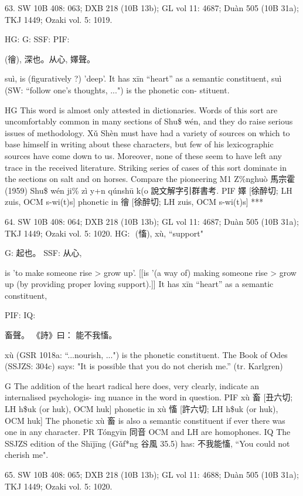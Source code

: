 63. SW 10B 408: 063; DXB 218 (10B 13b); GL vol 11: 4687; Duàn 505 (10B 31a); TKJ 1449; Ozaki vol. 5: 1019.


HG:
G: SSF: PIF:

(徻),
深也。从心, 嬕聲。

suì,
is (figuratively ?) 'deep'.
It has xīn ``heart'' as a semantic constituent,
suì (SW: ``follow one's thoughts, ...") is the phonetic con- stituent.

HG This word is almost only attested in dictionaries. Words of this sort are uncomfortably common in many sections of Shu\$ wén, and they do raise serious issues of methodology. Xǔ Shèn must have had a variety of sources on which to base himself in writing about these characters, but few of his lexicographic sources have come down to us. Moreover, none of these seem to have left any trace in the received literature. Striking series of cases of this sort dominate in the sections on salt  and  on  horses.  Compare  the  pioneering  M1  Z\%nghuò  馬宗霍 (1959)  Shu\$  wén  ji\%  zì  y+n qúnshū k(o 說文解字引群書考.
PIF     嬕 [徐醉切; LH zuis, OCM s-wi(t)s] phonetic in 徻 [徐醉切; LH zuis, OCM s-wi(t)s]
***

64. SW 10B 408: 064; DXB 218 (10B 13b); GL vol 11: 4687; Duàn 505 (10B 31a); TKJ 1449; Ozaki vol. 5: 1020.
HG:  (慉),	xù, ``support"




G:	起也。
SSF: 从心,

is 'to make someone rise > grow up'. [[is '(a way of) making someone rise > grow up (by providing proper loving support).]] It has xīn ``heart'' as a semantic constituent,

PIF: IQ:

畜聲。
《詩》曰： 能不我慉。

xù (GSR 1018a: ``...nourish, ...") is the phonetic constituent.
The Book of Odes (SSJZS: 304c) says:
"It is possible that you do not cherish me.'' (tr. Karlgren)

G	The addition of the heart radical here does, very clearly, indicate an internalised psychologis- ing nuance in the word in question.
PIF     xù 畜 [丑六切; LH h\$uk (or huk), OCM huk] phonetic in xù 慉 [許六切; LH h\$uk (or huk), OCM huk]
The phonetic xù 畜 is also a semantic constituent if ever there was one in any character.
PR	Tóngyīn 同音 OCM and LH are homophones.
IQ	The SSJZS edition of the Shījīng (Gǔf*ng 谷風 35.5) has: 不我能慉, ``You could not cherish me".


65. SW 10B 408: 065; DXB 218 (10B 13b); GL vol 11: 4688; Duàn 505 (10B 31a); TKJ 1449; Ozaki vol. 5: 1020.


